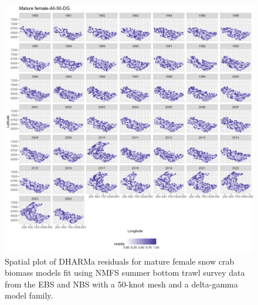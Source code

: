 \documentclass[
]{article}
\begin{document}
\begin{figure}

{\centering \includegraphics[width=1\linewidth,height=1\textheight]{../SNOW/Figures/DHARMa_Mature female-All-50-DG_SPATIAL} 

}

\caption{Spatial plot of DHARMa residuals for mature female snow crab biomass models fit using NMFS summer bottom trawl survey data from the EBS and NBS with a 50-knot mesh and a delta-gamma model family.}\label{fig:snow-DHARMa-spat-50-matfem-EBSNBS}
\end{figure}
\end{document}
